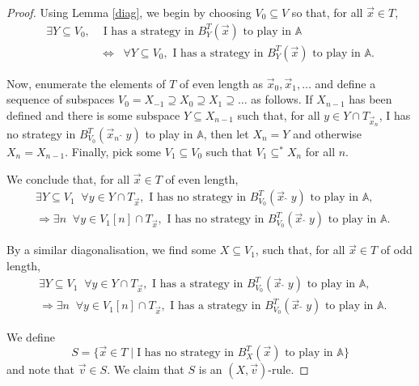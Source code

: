 \documentclass[10pt]{amsart}
\newcommand {\A}{\mathbb A}
\newcommand{\con}{\;\hat{}\;}
\newcommand{\saa}{\Rightarrow}
\newcommand{\equi}{\Longleftrightarrow}
\newcommand {\del}{ \; \big| \;}
\newcommand {\e} {\exists}
\renewcommand {\a} {\forall}
\theoremstyle{definition}
\begin{document}
\begin{proof}
Using Lemma \ref{diag}, we begin by choosing $V_0\subseteq V$ so that,  for all $\vec x\in T$,
\begin{equation}\begin{split}\label{y}
\e Y\subseteq V_0, &\text{ I has a strategy in $B^T_Y(\vec x)$ to play in $\A$ }\\
&
\equi\;\;
\a Y\subseteq V_0, \text{ I has a strategy in $B^T_Y(\vec x)$ to play in $\A$}.
\end{split}\end{equation}

Now, enumerate the elements of $T$ of even length as $\vec x_0,\vec x_1,\ldots$ and define a sequence of subspaces $V_0=X_{-1}\supseteq X_0\supseteq X_1\supseteq\ldots$ as follows. If $X_{n-1}$ has been defined and there is some subspace $Y\subseteq X_{n-1}$ such that,  for all $y\in Y\cap T_{\vec x_n}$, I has no strategy in $B^T_{V_0}(\vec x_n \con y)$ to play in $\A$, then let $X_n=Y$ and otherwise $X_n=X_{n-1}$. Finally, pick some $V_1\subseteq V_0$ such that $V_1\subseteq^*X_n$ for all $n$. 

We conclude that, for all $\vec x\in T$ of even length,  
\begin{equation}\begin{split}\label{yy}
&    \e Y\subseteq V_1\;\; \a y\in Y\cap T_{\vec x}, \text{ I has no strategy in $B^T_{V_0}(\vec x \con y)$ to play in $\A$, }\\
& \saa\e n\;\; \a y\in V_1[n]\cap T_{ \vec x}, \text{ I has no strategy in $B^T_{V_0}(\vec x\con y)$ to play in $\A$. }
\end{split}\end{equation}

By a similar diagonalisation, we find some $X\subseteq V_1$, such that,  for all $\vec x\in T$ of odd length,
\begin{equation}\begin{split}\label{yyy}
&    \e Y\subseteq V_1\;\; \a y\in Y\cap T_{\vec x}, \text{ I has a strategy in $B^T_{{V_0}}(\vec x \con y)$ to play in $\A$, }\\
& \saa\e n\;\; \a y\in V_1[n]\cap T_{ \vec x}, \text{ I has a strategy in $B^T_{{V_0}}(\vec x\con y)$ to play in $\A$. }
\end{split}\end{equation}


We define
 $$
 S=\{\vec x\in T\del \text{I has no strategy in $B^T_X(\vec x)$ to play in } \A\}
 $$
 and note that $\vec v \in S$. We claim that $S$ is an $(X,\vec v)$-rule.


\end{proof}
\end{document}
